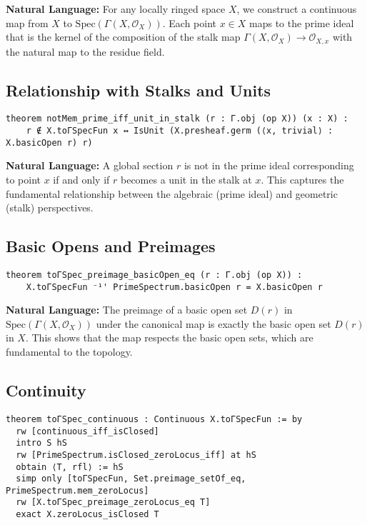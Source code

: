 \documentclass{article}
\theoremstyle{definition}
\begin{document}
\textbf{Natural Language:} For any locally ringed space $X$, we construct a continuous map from $X$ to $\mathrm{Spec}(\Gamma(X, \mathcal{O}_X))$. Each point $x \in X$ maps to the prime ideal that is the kernel of the composition of the stalk map $\Gamma(X, \mathcal{O}_X) \to \mathcal{O}_{X,x}$ with the natural map to the residue field.

\subsection{Relationship with Stalks and Units}

\begin{lstlisting}
theorem notMem_prime_iff_unit_in_stalk (r : Γ.obj (op X)) (x : X) :
    r ∉ X.toΓSpecFun x ↔ IsUnit (X.presheaf.germ (⟨x, trivial⟩ : X.basicOpen r) r)
\end{lstlisting}

\textbf{Natural Language:} A global section $r$ is not in the prime ideal corresponding to point $x$ if and only if $r$ becomes a unit in the stalk at $x$. This captures the fundamental relationship between the algebraic (prime ideal) and geometric (stalk) perspectives.

\subsection{Basic Opens and Preimages}

\begin{lstlisting}
theorem toΓSpec_preimage_basicOpen_eq (r : Γ.obj (op X)) :
    X.toΓSpecFun ⁻¹' PrimeSpectrum.basicOpen r = X.basicOpen r
\end{lstlisting}

\textbf{Natural Language:} The preimage of a basic open set $D(r)$ in $\mathrm{Spec}(\Gamma(X, \mathcal{O}_X))$ under the canonical map is exactly the basic open set $D(r)$ in $X$. This shows that the map respects the basic open sets, which are fundamental to the topology.

\subsection{Continuity}

\begin{lstlisting}
theorem toΓSpec_continuous : Continuous X.toΓSpecFun := by
  rw [continuous_iff_isClosed]
  intro S hS
  rw [PrimeSpectrum.isClosed_zeroLocus_iff] at hS
  obtain ⟨T, rfl⟩ := hS
  simp only [toΓSpecFun, Set.preimage_setOf_eq, PrimeSpectrum.mem_zeroLocus]
  rw [X.toΓSpec_preimage_zeroLocus_eq T]
  exact X.zeroLocus_isClosed T
\end{lstlisting}
\end{document}

